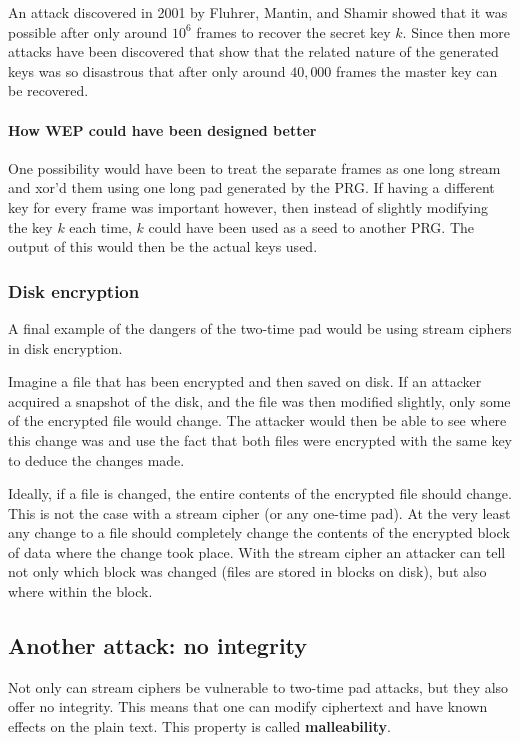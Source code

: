 \documentclass[10pt,a4paper]{report}
\begin{document}
An attack discovered in 2001 by Fluhrer, Mantin, and Shamir showed that it was possible after only
around $10^6$ frames to recover the secret key $k$. Since then more attacks have been discovered
that show that the related nature of the generated keys was so disastrous that after only around
$40,000$ frames the master key can be recovered.

\paragraph{How WEP could have been designed better} One possibility would have been to treat the
separate frames as one long stream and xor'd them using one long pad generated by the PRG. If
having a different key for every frame was important however, then instead of slightly modifying
the key $k$ each time, $k$ could have been used as a seed to another PRG. The output of this would
then be the actual keys used.

\subsubsection*{Disk encryption}

A final example of the dangers of the two-time pad would be using stream ciphers in disk
encryption.

Imagine a file that has been encrypted and then saved on disk. If an attacker acquired a snapshot
of the disk, and the file was then modified slightly, only some of the encrypted file would change.
The attacker would then be able to see where this change was and use the fact that both files
were encrypted with the same key to deduce the changes made.

Ideally, if a file is changed, the entire contents of the encrypted file should change. This is not
the case with a stream cipher (or any one-time pad). At the very least any change to a file should
completely change the contents of the encrypted block of data where the change took place. With the
stream cipher an attacker can tell not only which block was changed (files are stored in blocks on
disk), but also where within the block.

\subsection{Another attack: no integrity}

Not only can stream ciphers be vulnerable to two-time pad attacks, but they also offer no
integrity. This means that one can modify ciphertext and have known effects on the plain text. This
property is called \textbf{malleability}.
\end{document}

